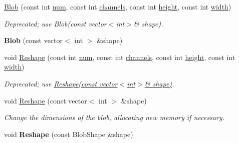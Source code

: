 \begin{DoxyCompactItemize}
\item 
\hyperlink{classcaffe_1_1Blob_a379df830aad9b3cae253e1ddb0863844}{Blob} (const int \hyperlink{classcaffe_1_1Blob_a56c2b25db397d9e82bbd7c43597ae427}{num}, const int \hyperlink{classcaffe_1_1Blob_a744a987091c4496a2236898ee39558ec}{channels}, const int \hyperlink{classcaffe_1_1Blob_a422a10a605c30ac02a5377e7cf4c8c6c}{height}, const int \hyperlink{classcaffe_1_1Blob_a781b5410b7894455a85cd283cf8ee02a}{width})\hypertarget{classcaffe_1_1Blob_a379df830aad9b3cae253e1ddb0863844}{}\label{classcaffe_1_1Blob_a379df830aad9b3cae253e1ddb0863844}

\begin{DoxyCompactList}\small\item\em Deprecated; use {\ttfamily Blob(const vector$<$int$>$\& shape)}. \end{DoxyCompactList}\item 
{\bfseries Blob} (const vector$<$ int $>$ \&shape)\hypertarget{classcaffe_1_1Blob_a2268ef004df012760d300465a28f0f68}{}\label{classcaffe_1_1Blob_a2268ef004df012760d300465a28f0f68}

\item 
void \hyperlink{classcaffe_1_1Blob_ad0e0a9a4f49478e89161c6afe4e341a0}{Reshape} (const int \hyperlink{classcaffe_1_1Blob_a56c2b25db397d9e82bbd7c43597ae427}{num}, const int \hyperlink{classcaffe_1_1Blob_a744a987091c4496a2236898ee39558ec}{channels}, const int \hyperlink{classcaffe_1_1Blob_a422a10a605c30ac02a5377e7cf4c8c6c}{height}, const int \hyperlink{classcaffe_1_1Blob_a781b5410b7894455a85cd283cf8ee02a}{width})\hypertarget{classcaffe_1_1Blob_ad0e0a9a4f49478e89161c6afe4e341a0}{}\label{classcaffe_1_1Blob_ad0e0a9a4f49478e89161c6afe4e341a0}

\begin{DoxyCompactList}\small\item\em Deprecated; use {\ttfamily \hyperlink{classcaffe_1_1Blob_ac9ce456aa623ff3f4d24225a0db14404}{Reshape(const vector$<$int$>$\& shape)}}. \end{DoxyCompactList}\item 
void \hyperlink{classcaffe_1_1Blob_ac9ce456aa623ff3f4d24225a0db14404}{Reshape} (const vector$<$ int $>$ \&shape)
\begin{DoxyCompactList}\small\item\em Change the dimensions of the blob, allocating new memory if necessary. \end{DoxyCompactList}\item 
void {\bfseries Reshape} (const Blob\+Shape \&shape)\hypertarget{classcaffe_1_1Blob_a787ff5e31db6b53b70fb117002ec0385}{}\label{classcaffe_1_1Blob_a787ff5e31db6b53b70fb117002ec0385}


\end{DoxyCompactItemize}
